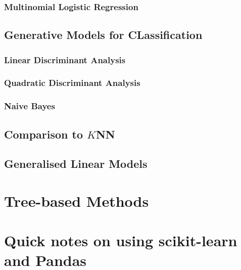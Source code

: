 \documentclass[11pt]{article}
\theoremstyle{definition}
\begin{document}
\subsubsection{Multinomial Logistic Regression}
\subsection{Generative Models for CLassification}
\subsubsection{Linear Discriminant Analysis}
\subsubsection{Quadratic Discriminant Analysis}
\subsubsection{Naive Bayes}
\subsection{Comparison to $K$NN}
\subsection{Generalised Linear Models}

\section{}
\section{}
\section{}
\section{Tree-based Methods}
\section{}
\section{}
\section{Quick notes on using scikit-learn and Pandas}
\end{document}
